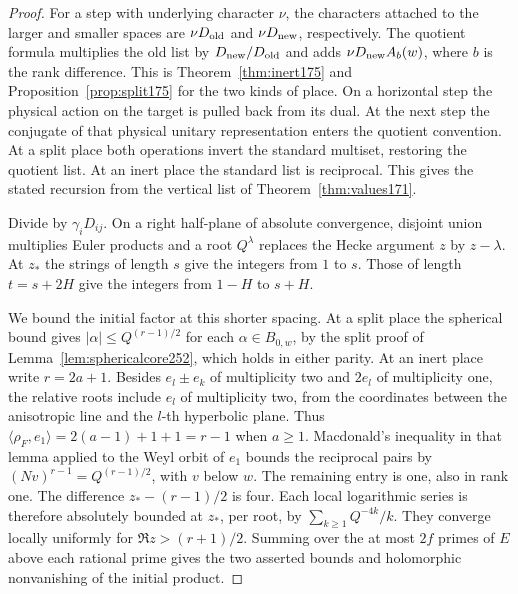 \documentclass[a4paper,11pt]{article}
\theoremstyle{definition}
\theoremstyle{remark}
\numberwithin{equation}{section}
\begin{document}
\begin{proof}
For a step with underlying character \(\nu\), the characters
attached to the larger and smaller spaces are \(\nu D_{\rm old}\)
and \(\nu D_{\rm new}\), respectively. The quotient formula
multiplies the old list by \(D_{\rm new}/D_{\rm old}\) and
adds \(\nu D_{\rm new}A_b(w)\), where \(b\) is the rank
difference. This is Theorem~\ref{thm:inert175} and
Proposition~\ref{prop:split175} for the two kinds of place.
On a horizontal step the physical action on the target is
pulled back from its dual. At the next step the conjugate of
that physical unitary representation enters the quotient
convention. At a split place both operations invert the
standard multiset, restoring the quotient list. At an inert
place the standard list is reciprocal. This gives the stated
recursion from the vertical list of Theorem~\ref{thm:values171}.

Divide by \(\gamma_iD_{ij}\). On a right half-plane of absolute
convergence, disjoint union multiplies Euler products and a root
\(Q^\lambda\) replaces the Hecke argument \(z\) by \(z-\lambda\).
At \(z_*\) the strings of length \(s\) give the integers from
\(1\) to \(s\). Those of length \(t=s+2H\) give the integers
from \(1-H\) to \(s+H\).

We bound the initial factor at this shorter spacing. At a split
place the spherical bound gives \(|\alpha|\le Q^{(r-1)/2}\)
for each \(\alpha\in B_{0,w}\), by the split proof of
Lemma~\ref{lem:sphericalcore252}, which holds in either parity.
At an inert place write \(r=2a+1\). Besides \(e_l\pm e_k\)
of multiplicity two and \(2e_l\) of multiplicity one, the
relative roots include \(e_l\) of multiplicity two, from the
coordinates between the anisotropic line and the \(l\)-th
hyperbolic plane. Thus \(\langle\rho_F,e_1\rangle=
2(a-1)+1+1=r-1\) when \(a\ge1\). Macdonald's inequality in
that lemma applied to the Weyl orbit of \(e_1\) bounds the
reciprocal pairs by \((Nv)^{r-1}=Q^{(r-1)/2}\), with \(v\)
below \(w\). The remaining entry is one, also in rank one.
The difference \(z_*-(r-1)/2\) is four. Each local logarithmic
series is therefore absolutely bounded at \(z_*\), per root,
by \(\sum_{k\ge1}Q^{-4k}/k\). They converge locally uniformly
for \(\Re z>(r+1)/2\). Summing over the at most \(2f\) primes
of \(E\) above each rational prime gives the two asserted
bounds and holomorphic nonvanishing of the initial product.


\end{proof}
\end{document}

